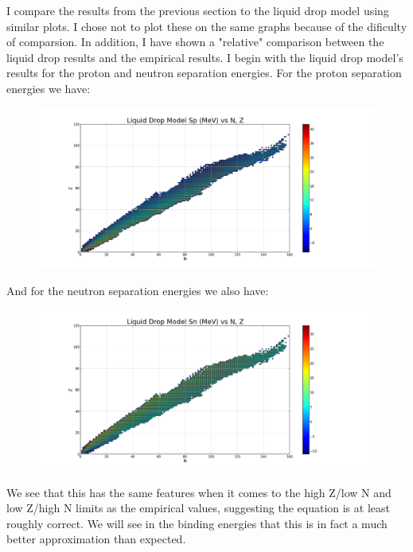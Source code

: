 \documentclass[11pt]{article} %
\begin{document}
I compare the results from the previous section to the liquid drop model using similar plots. I chose not to plot these on the same graphs because of the dificulty of comparsion. In addition, I have shown a "relative" comparison between the liquid drop results and the empirical results. I begin with the liquid drop model's results for the proton and neutron separation energies.
For the proton separation energies we have:\\
\begin{figure}[h]
\centering
\includegraphics[width=\linewidth]{"LiquidDropProtonSepEnergy"}
\end{figure}
\newpage
And for the neutron separation energies we also have:\\
\vspace{1mm}
\begin{figure}[h!]
\centering
\includegraphics[width=\linewidth]{"LiquidDropNeutronSepEnergy"}
\end{figure}
\vspace{1mm}

We see that this has the same features when it comes to the high Z/low N and low Z/high N limits as the empirical values, suggesting the equation is at least roughly correct. We will see in the binding energies that this is in fact a much better approximation than expected. \\
\end{document}
